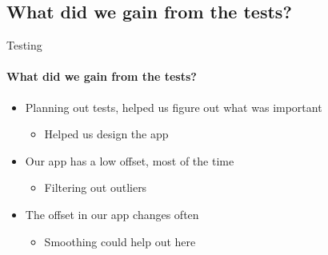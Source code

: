     \subsection{What did we gain from the tests?}
        \begin{frame}{Testing}\framesubtitle{What did we gain from the tests?}
            \begin{itemize}
                \item Planning out tests, helped us figure out what was important
                \begin{itemize}

                    \item Helped us design the app
                \end{itemize}
                \item Our app has a low offset, most of the time
                \begin{itemize}
                    \item Filtering out outliers
                \end{itemize}
                \item The offset in our app changes often
                \begin{itemize}
                    \item Smoothing could help out here
                \end{itemize}

            \end{itemize}
        \end{frame}

